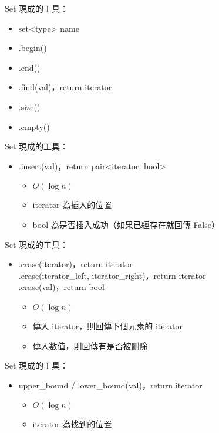 \documentclass[mathserif]{beamer}
\begin{document}
\begin{frame}{Set}
    現成的工具：
    \begin{itemize}
        \item set<{\color{red}type}> {\color{red}name}
        \item .begin()
        \item .end()
        \item .find({\color{red}val})，return iterator
        \item .size()
        \item .empty()
    \end{itemize}
\end{frame}

\begin{frame}{Set}
    現成的工具：
    \begin{itemize}
        \item .insert({\color{red}val})，return pair<iterator, bool>
        \begin{itemize}
            \item $O(\log{n})$
            \item iterator 為插入的位置
            \item bool 為是否插入成功（如果已經存在就回傳 False）
        \end{itemize}
    \end{itemize}
\end{frame}

\begin{frame}{Set}
    現成的工具：
    \begin{itemize}
        \item .erase({\color{red}iterator})，return iterator
        \\.erase({\color{red}iterator\_left}, {\color{red}iterator\_right})，return iterator
        \\.erase({\color{red}val})，return bool
        \begin{itemize}
            \item $O(\log{n})$
            \item 傳入 iterator，則回傳下個元素的 iterator
            \item 傳入數值，則回傳有是否被刪除
        \end{itemize}
    \end{itemize}
\end{frame}

\begin{frame}{Set}
    現成的工具：
    \begin{itemize}
        \item upper\_bound / lower\_bound({\color{red}val})，return iterator
        \begin{itemize}
            \item $O(\log{n})$
            \item iterator 為找到的位置
        \end{itemize}
    \end{itemize}
\end{frame}
\end{document}

